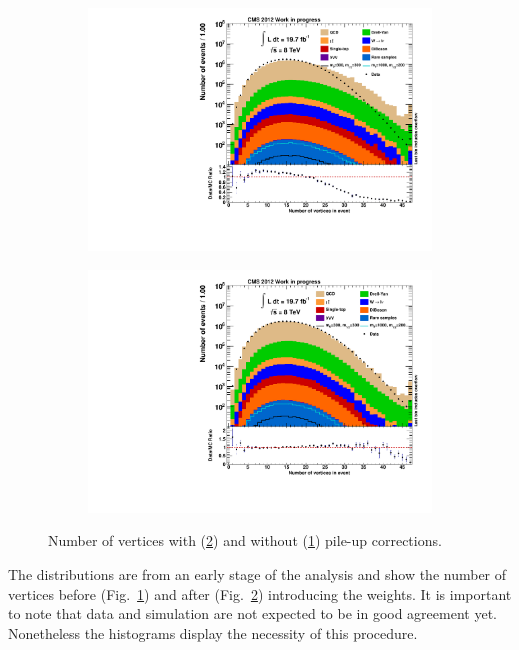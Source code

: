 \begin{figure}[htb!]
  \centering
  \begin{subfigure}[b]{0.495\textwidth}
    \centering
    \includegraphics[width=\textwidth]{plots/vtx_n_nopu.pdf}
    \caption{\label{fig:vtx_n_nopu}}
  \end{subfigure}
  \begin{subfigure}[b]{0.495\textwidth}
    \centering
    \includegraphics[width=\textwidth]{plots/vtx_n.pdf}
    \caption{\label{fig:vtx_n}}
  \end{subfigure}
  \caption{Number of vertices with (\ref{fig:vtx_n}) and without (\ref{fig:vtx_n_nopu}) pile-up corrections.}
  \label{fig:vtxn}
\end{figure}

\noindent The distributions are from an early stage of the analysis and show the number of vertices before (Fig.~\ref{fig:vtx_n_nopu}) and after (Fig.~\ref{fig:vtx_n}) introducing the weights. It is important to note that data and simulation are not expected to be in good agreement yet. Nonetheless the histograms display the necessity of this procedure.   


